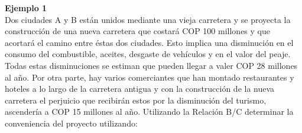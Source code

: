 \textbf{Ejemplo 1}\\

Dos ciudades A y B están unidos mediante una vieja carretera y se proyecta la construcción de una nueva carretera que costará   COP  100 millones y que acortará el camino entre éstas dos ciudades. Esto implica una disminución en el consumo del combustible, aceites, desgaste de vehículos y en el valor del peaje. Todas estas disminuciones se estiman que pueden llegar a valer   COP  28 millones al año. Por otra parte, hay varios comerciantes que han montado restaurantes y hoteles a lo largo de la carretera antigua y con la construcción de la nueva carretera el perjuicio que recibirán estos por la disminución del turismo, ascendería a   COP  15 millones al año. Utilizando la Relación B/C determinar la conveniencia del proyecto utilizando:
\\

